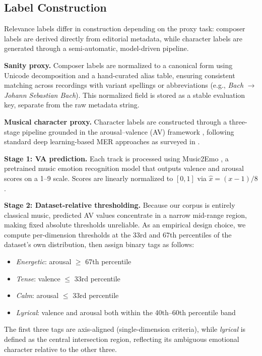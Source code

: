\documentclass{article}
\begin{document}
\subsection{Label Construction}

Relevance labels differ in construction depending on the proxy task: composer labels are derived directly from editorial metadata, while character labels are generated through a semi-automatic, model-driven pipeline.

\smallskip
\noindent\textbf{Sanity proxy.}
Composer labels are normalized to a canonical form using Unicode decomposition and a hand-curated
alias table, ensuring consistent matching across recordings with variant spellings or abbreviations
(e.g., \textit{Bach} $\to$ \textit{Johann Sebastian Bach}).
This normalized field is stored as a stable evaluation key, separate from the raw metadata string.

\smallskip
\noindent\textbf{Musical character proxy.}
Character labels are constructed through a three-stage pipeline grounded in the arousal--valence
(AV) framework \cite{eerola2011}, following standard deep learning-based MER approaches as
surveyed in \cite{jiang2024}.

\textbf{Stage 1: VA prediction.}
Each track is processed using Music2Emo \cite{music2emo2025}, a pretrained music emotion
recognition model that outputs valence and arousal scores on a 1--9 scale. Scores are linearly
normalized to $[0, 1]$ via $\hat{x} = (x - 1) / 8$.

\textbf{Stage 2: Dataset-relative thresholding.}
Because our corpus is entirely classical music, predicted AV values concentrate in a narrow
mid-range region, making fixed absolute thresholds unreliable. As an empirical design choice,
we compute per-dimension thresholds at the 33rd and 67th percentiles of the dataset's own
distribution, then assign binary tags as follows:
\begin{itemize}
  \item \textit{Energetic}: arousal $\geq$ 67th percentile
  \item \textit{Tense}: valence $\leq$ 33rd percentile
  \item \textit{Calm}: arousal $\leq$ 33rd percentile
  \item \textit{Lyrical}: valence and arousal both within the 40th--60th percentile band
\end{itemize}
The first three tags are axis-aligned (single-dimension criteria), while \textit{lyrical} is
defined as the central intersection region, reflecting its ambiguous emotional character relative
to the other three.
\end{document}
